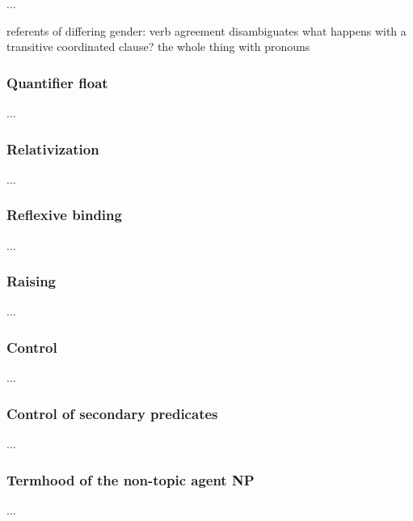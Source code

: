 ...

\ex referents of differing gender: verb agreement disambiguates \xe
\ex what happens with a transitive coordinated clause? \xe
\ex the whole thing with pronouns \xe

\subsubsection{Quantifier float}
\label{subsubsec:quantfloat}

...

\subsubsection{Relativization}
\label{subsubsec:relz}

...

\subsubsection{Reflexive binding}
\label{subsubsec:reflbind}

...

\subsubsection{Raising}
\label{subsubsec:raising}

...

\subsubsection{Control}
\label{subsubsec:control}

...

\subsubsection{Control of secondary predicates}
\label{subsubsec:secpred}

...

\subsubsection{Termhood of the non-topic agent NP}
\label{subsubsec:agtnpterm}

...

